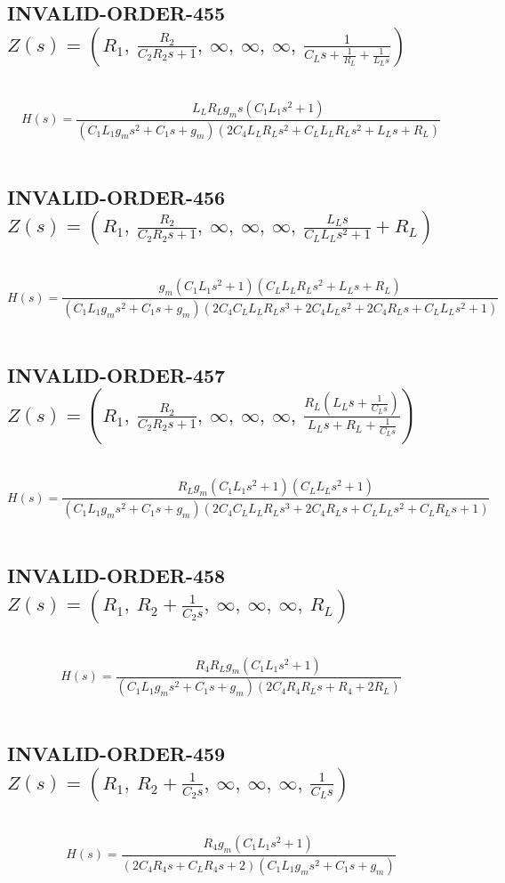 \documentclass{article}
\begin{document}
\subsection{INVALID-ORDER-455 $Z(s) = \left( R_{1}, \  \frac{R_{2}}{C_{2} R_{2} s + 1}, \  \infty, \  \infty, \  \infty, \  \frac{1}{C_{L} s + \frac{1}{R_{L}} + \frac{1}{L_{L} s}}\right)$ } \ 
\textbf{\[H(s) = \frac{L_{L} R_{L} g_{m} s \left(C_{1} L_{1} s^{2} + 1\right)}{\left(C_{1} L_{1} g_{m} s^{2} + C_{1} s + g_{m}\right) \left(2 C_{4} L_{L} R_{L} s^{2} + C_{L} L_{L} R_{L} s^{2} + L_{L} s + R_{L}\right)}\] } \ 
\subsection{INVALID-ORDER-456 $Z(s) = \left( R_{1}, \  \frac{R_{2}}{C_{2} R_{2} s + 1}, \  \infty, \  \infty, \  \infty, \  \frac{L_{L} s}{C_{L} L_{L} s^{2} + 1} + R_{L}\right)$ } \ 
\textbf{\[H(s) = \frac{g_{m} \left(C_{1} L_{1} s^{2} + 1\right) \left(C_{L} L_{L} R_{L} s^{2} + L_{L} s + R_{L}\right)}{\left(C_{1} L_{1} g_{m} s^{2} + C_{1} s + g_{m}\right) \left(2 C_{4} C_{L} L_{L} R_{L} s^{3} + 2 C_{4} L_{L} s^{2} + 2 C_{4} R_{L} s + C_{L} L_{L} s^{2} + 1\right)}\] } \ 
\subsection{INVALID-ORDER-457 $Z(s) = \left( R_{1}, \  \frac{R_{2}}{C_{2} R_{2} s + 1}, \  \infty, \  \infty, \  \infty, \  \frac{R_{L} \left(L_{L} s + \frac{1}{C_{L} s}\right)}{L_{L} s + R_{L} + \frac{1}{C_{L} s}}\right)$ } \ 
\textbf{\[H(s) = \frac{R_{L} g_{m} \left(C_{1} L_{1} s^{2} + 1\right) \left(C_{L} L_{L} s^{2} + 1\right)}{\left(C_{1} L_{1} g_{m} s^{2} + C_{1} s + g_{m}\right) \left(2 C_{4} C_{L} L_{L} R_{L} s^{3} + 2 C_{4} R_{L} s + C_{L} L_{L} s^{2} + C_{L} R_{L} s + 1\right)}\] } \ 
\subsection{INVALID-ORDER-458 $Z(s) = \left( R_{1}, \  R_{2} + \frac{1}{C_{2} s}, \  \infty, \  \infty, \  \infty, \  R_{L}\right)$ } \ 
\textbf{\[H(s) = \frac{R_{4} R_{L} g_{m} \left(C_{1} L_{1} s^{2} + 1\right)}{\left(C_{1} L_{1} g_{m} s^{2} + C_{1} s + g_{m}\right) \left(2 C_{4} R_{4} R_{L} s + R_{4} + 2 R_{L}\right)}\] } \ 
\subsection{INVALID-ORDER-459 $Z(s) = \left( R_{1}, \  R_{2} + \frac{1}{C_{2} s}, \  \infty, \  \infty, \  \infty, \  \frac{1}{C_{L} s}\right)$ } \ 
\textbf{\[H(s) = \frac{R_{4} g_{m} \left(C_{1} L_{1} s^{2} + 1\right)}{\left(2 C_{4} R_{4} s + C_{L} R_{4} s + 2\right) \left(C_{1} L_{1} g_{m} s^{2} + C_{1} s + g_{m}\right)}\] } \ 
\end{document}
